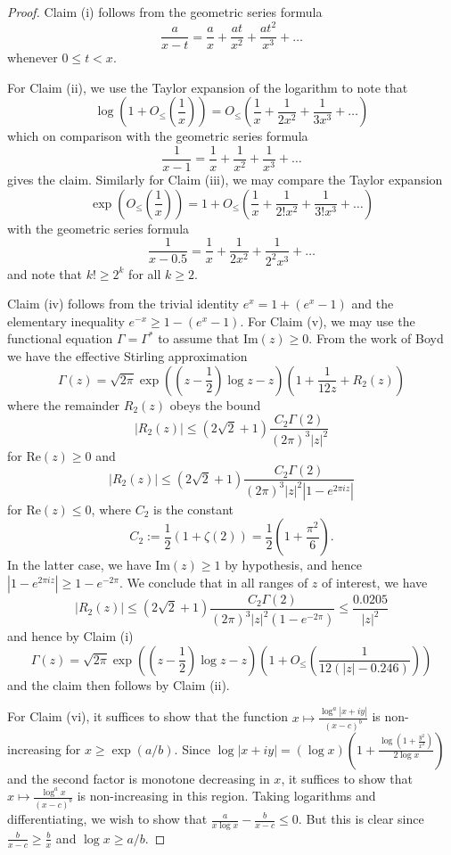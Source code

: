 \documentclass[a4paper,11pt,twoside]{amsart}
\begin{document}
\begin{proof}  Claim (i) follows from the geometric series formula
$$ \frac{a}{x-t} = \frac{a}{x} + \frac{at}{x^2} + \frac{at^2}{x^3} + \dots$$
whenever $0 \leq t < x$.

For Claim (ii), we use the Taylor expansion of the logarithm to note that
$$\log\left( 1 + O_{\leq}\left(\frac{1}{x}\right) \right) = O_{\leq}\left(\frac{1}{x} + \frac{1}{2x^2} + \frac{1}{3x^3} + \dots\right)$$
which on comparison with the geometric series formula
$$\frac{1}{x-1} = \frac{1}{x} + \frac{1}{x^2} + \frac{1}{x^3} + \dots$$
gives the claim.  Similarly for Claim (iii), we may compare the Taylor expansion
$$\exp\left( O_{\leq}\left(\frac{1}{x}\right) \right) = 1 + O_{\leq}\left(\frac{1}{x} + \frac{1}{2! x^2} + \frac{1}{3! x^3} + \dots\right)$$
with the geometric series formula
$$ \frac{1}{x-0.5} = \frac{1}{x} + \frac{1}{2x^2} + \frac{1}{2^2 x^3} + \dots$$
and note that $k! \geq 2^k$ for all $k \geq 2$.

Claim (iv) follows from the trivial identity $e^x = 1 + (e^x-1)$ and the elementary inequality $e^{-x} \geq 1 - (e^x-1)$.
For Claim (v), we may use the functional equation $\Gamma = \Gamma^*$ to assume that $\mathrm{Im}(z) \geq 0$.  From the work of Boyd \cite[(1.13), (3.1), (3.14), (3.15)]{boyd} we have the effective Stirling approximation
$$ \Gamma(z) = \sqrt{2\pi} \exp\left( \left(z-\frac{1}{2}\right) \log z - z \right) \left(1 + \frac{1}{12 z} + R_2(z) \right)$$
where the remainder $R_2(z)$ obeys the bound
$$ |R_2(z)| \leq (2 \sqrt{2}+1) \frac{C_2 \Gamma(2)}{(2\pi)^3 |z|^2} $$
for $\mathrm{Re}(z) \geq 0$ and
$$|R_2(z)| \leq (2 \sqrt{2}+1) \frac{C_2 \Gamma(2)}{(2\pi)^3 |z|^2 |1 - e^{2\pi i z}|} $$
for $\mathrm{Re}(z) \leq 0$, where $C_2$ is the constant
$$ C_2 := \frac{1}{2} (1 + \zeta(2)) = \frac{1}{2} \left(1 + \frac{\pi^2}{6}\right).$$
In the latter case, we have $\mathrm{Im}(z) \geq 1$ by hypothesis, and hence $|1 - e^{2\pi i z}| \geq 1 - e^{-2\pi}$.  We conclude that in all ranges of $z$ of interest, we have
$$|R_2(z)| \leq (2 \sqrt{2}+1) \frac{C_2 \Gamma(2)}{(2\pi)^3 |z|^2 (1 - e^{-2\pi})} \leq \frac{0.0205}{|z|^2}$$
and hence by Claim (i)
$$ \Gamma(z) = \sqrt{2\pi} \exp\left( \left(z-\frac{1}{2}\right) \log z - z \right) \left(1 + O_{\leq}\left( \frac{1}{12(|z| - 0.246)} \right)\right) $$
and the claim then follows by Claim (ii).  

For Claim (vi), it suffices to show that the function $x \mapsto \frac{\log^a |x+iy|}{(x-c)^b}$ is non-increasing for $x \geq \exp(a/b)$.  Since $\log |x+iy| = (\log x) (1 + \frac{\log(1 + \frac{y^2}{x^2})}{2 \log x})$ and the second factor is monotone decreasing in $x$, it suffices to show that $x \mapsto \frac{\log^a x}{(x-c)^b}$ is non-increasing in this region.  Taking logarithms and differentiating, we wish to show that $\frac{a}{x \log x} - \frac{b}{x-c} \leq 0$.  But this is clear since $\frac{b}{x-c} \geq \frac{b}{x}$ and $\log x \geq a/b$.
\end{proof}
\end{document}
